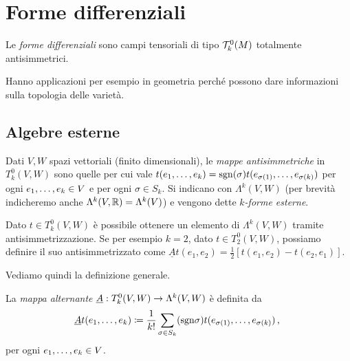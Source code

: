 \chapter{Forme differenziali} %

\begin{definition} 
	Le \emph{forme differenziali} sono campi tensoriali di tipo $\Tau_k^0(M)$ totalmente antisimmetrici.
\end{definition}

Hanno applicazioni per esempio in geometria perché possono dare informazioni sulla topologia delle varietà.

\section{Algebre esterne}

\begin{definition}  
Dati $V,W$ spazi vettoriali (finito dimensionali), le \emph{mappe antisimmetriche} in $T^0_k(V,W)$ sono quelle per cui vale $t(\seqb{e}{k}{,}) = \sgn(\sigma) t(e_{\sigma(1)},\ldots, e_{\sigma(k)})$ per ogni $\seqb{e}{k}{,} \in V$ e per ogni $\sigma\in S_k$.
Si indicano con $\Lambda^k(V,W)$ (per brevità indicheremo anche $\Lambda^k(V,\R) = \Lambda^k(V)$) e vengono dette \emph{$k$-forme esterne}.

\end{definition}

Dato $t\in T^0_k(V,W)$ è possibile ottenere un elemento di $\Lambda^k(V,W)$ tramite antisimmetrizzazione.
Se per esempio $k=2$, dato $t\in T^0_2(V,W)$, possiamo definire il suo antisimmetrizzato come $\underline{A}t(e_1,e_2) = \frac 12 [t(e_1,e_2) - t(e_2,e_1)]$.

Vediamo quindi la definizione generale.

\begin{definition} 
	La \emph{mappa alternante} $\antisimm:T^0_k(V,W) \to \Lambda^k(V,W)$ è definita da
	\begin{equation*}
		\antisimm t(\seqb{e}{k}{,}) \coloneqq \frac 1 {k!} \sum_{\sigma \in S_k} (\sgn \sigma) t(e_{\sigma(1)},\ldots, e_{\sigma(k)}) \virgola
	\end{equation*}
	per ogni $\seqb{e}{k}{,} \in V$.
\end{definition}

